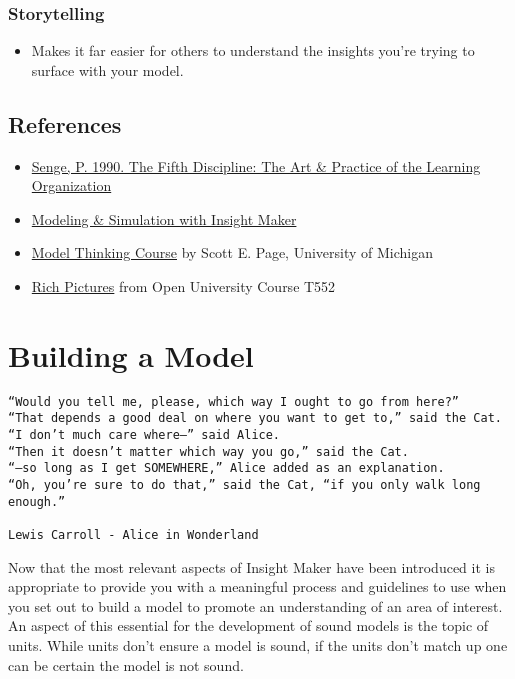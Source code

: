 \documentclass[]{memoir}
\begin{document}
\subsection{Storytelling}

\begin{itemize}
\itemsep1pt\parskip0pt
\item
  Makes it far easier for others to understand the insights you're
  trying to surface with your model.
\end{itemize}

\section{References}

\begin{itemize}
\itemsep1pt\parskip0pt
\item
  \href{http://www.amazon.com/Fifth-Discipline-Practice-Organization-ebook/dp/B000SEIFKK/}{Senge,
  P. 1990. The Fifth Discipline: The Art \& Practice of the Learning
  Organization}
\item
  \href{http://www.systemswiki.org/index.php?title=Modeling_\%26_Simulation_with_Insight_Maker}{Modeling
  \& Simulation with Insight Maker}
\item
  \href{https://www.coursera.org/course/modelthinking}{Model Thinking
  Course} by Scott E. Page, University of Michigan
\item
  \href{http://systems.open.ac.uk/materials/T552/pages/rich/richAppendix.html}{Rich
  Pictures} from Open University Course T552
\end{itemize}

\chapter{Building a Model}

\begin{lstlisting}
“Would you tell me, please, which way I ought to go from here?”
“That depends a good deal on where you want to get to,” said the Cat.
“I don’t much care where–” said Alice.
“Then it doesn’t matter which way you go,” said the Cat.
“–so long as I get SOMEWHERE,” Alice added as an explanation.
“Oh, you’re sure to do that,” said the Cat, “if you only walk long enough.”

Lewis Carroll - Alice in Wonderland
\end{lstlisting}

Now that the most relevant aspects of Insight Maker have been introduced
it is appropriate to provide you with a meaningful process and
guidelines to use when you set out to build a model to promote an
understanding of an area of interest. An aspect of this essential for
the development of sound models is the topic of units. While units don't
ensure a model is sound, if the units don't match up one can be certain
the model is not sound.
\end{document}
